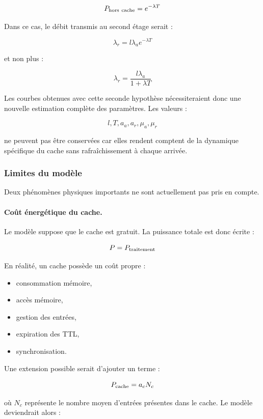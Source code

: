 \documentclass[12pt, a4paper]{report}
\begin{document}
	\[
	P_{\rm hors~cache}=e^{-\lambda T}
	\]


	\noindent Dans ce cas, le débit transmis au second étage serait :


	\[
	\lambda_r
	=
	l\lambda_a e^{-\lambda T}
	\]


	\noindent et non plus :


	\[
	\lambda_r
	=
	\frac{l\lambda_a}{1+\lambda T}
	\]


	\noindent Les courbes obtenues avec cette seconde hypothèse nécessiteraient donc
	une nouvelle estimation complète des paramètres.
	Les valeurs :

	\[
	l,T,a_a,a_r,\mu_a,\mu_r
	\]

	\noindent ne peuvent pas être conservées car elles rendent comptent de la
	dynamique spécifique du cache sans rafraîchissement à chaque arrivée.


	\subsubsection{Limites du modèle}


	\noindent Deux phénomènes physiques importants ne sont actuellement pas pris en
	compte.


	\paragraph{Coût énergétique du cache.}


	\noindent Le modèle suppose que le cache est gratuit.
	La puissance totale est donc écrite :

	\[
	P=P_{\rm traitement}
	\]


	\noindent En réalité, un cache possède un coût propre :\\

	\begin{itemize}
	\item consommation mémoire,
	\item accès mémoire,
	\item gestion des entrées,
	\item expiration des TTL,
	\item synchronisation.\\
	\end{itemize}


	\noindent Une extension possible serait d'ajouter un terme :

	\[
	P_{\rm cache}=a_c N_c
	\]


	\noindent où $N_c$ représente le nombre moyen d'entrées présentes dans le cache.
	Le modèle deviendrait alors :
\end{document}
